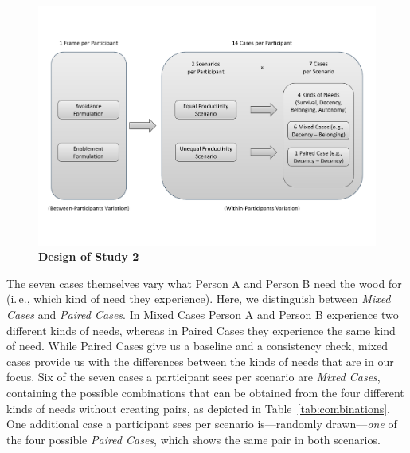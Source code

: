 \documentclass[10pt,letterpaper]{article}
\begin{document}
\begin{figure}[t]
   \includegraphics[width=\linewidth]{figures/figure_3.pdf}
   \caption{\bf Design of Study 2}
   \label{fig:study_2_design}
\end{figure}

The seven cases themselves vary what Person A and Person B need the wood for (i.\,e., which kind of need they experience).
Here, we distinguish between \textit{Mixed Cases} and \textit{Paired Cases}.
In Mixed Cases Person A and Person B experience two different kinds of needs, whereas in Paired Cases they experience the same kind of need.
While Paired Cases give us a baseline and a consistency check, mixed cases provide us with the differences between the kinds of needs that are in our focus.
Six of the seven cases a participant sees per scenario are \textit{Mixed Cases}, containing the possible combinations that can be obtained from the four different kinds of needs without creating pairs, as depicted in Table~\ref{tab:combinations}.
One additional case a participant sees per scenario is---randomly drawn---\textit{one} of the four possible \textit{Paired Cases}, which shows the same pair in both scenarios.
\end{document}
